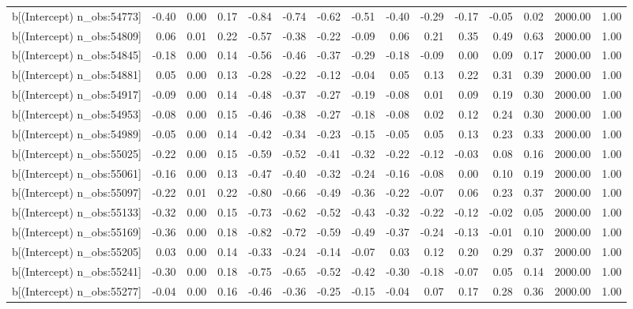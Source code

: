 \begin{table}[ht]
\begin{tabular}{rrrrrrrrrrrrrrr}
  b[(Intercept) n\_obs:54773] & -0.40 & 0.00 & 0.17 & -0.84 & -0.74 & -0.62 & -0.51 & -0.40 & -0.29 & -0.17 & -0.05 & 0.02 & 2000.00 & 1.00 \\ 
  b[(Intercept) n\_obs:54809] & 0.06 & 0.01 & 0.22 & -0.57 & -0.38 & -0.22 & -0.09 & 0.06 & 0.21 & 0.35 & 0.49 & 0.63 & 2000.00 & 1.00 \\ 
  b[(Intercept) n\_obs:54845] & -0.18 & 0.00 & 0.14 & -0.56 & -0.46 & -0.37 & -0.29 & -0.18 & -0.09 & 0.00 & 0.09 & 0.17 & 2000.00 & 1.00 \\ 
  b[(Intercept) n\_obs:54881] & 0.05 & 0.00 & 0.13 & -0.28 & -0.22 & -0.12 & -0.04 & 0.05 & 0.13 & 0.22 & 0.31 & 0.39 & 2000.00 & 1.00 \\ 
  b[(Intercept) n\_obs:54917] & -0.09 & 0.00 & 0.14 & -0.48 & -0.37 & -0.27 & -0.19 & -0.08 & 0.01 & 0.09 & 0.19 & 0.30 & 2000.00 & 1.00 \\ 
  b[(Intercept) n\_obs:54953] & -0.08 & 0.00 & 0.15 & -0.46 & -0.38 & -0.27 & -0.18 & -0.08 & 0.02 & 0.12 & 0.24 & 0.30 & 2000.00 & 1.00 \\ 
  b[(Intercept) n\_obs:54989] & -0.05 & 0.00 & 0.14 & -0.42 & -0.34 & -0.23 & -0.15 & -0.05 & 0.05 & 0.13 & 0.23 & 0.33 & 2000.00 & 1.00 \\ 
  b[(Intercept) n\_obs:55025] & -0.22 & 0.00 & 0.15 & -0.59 & -0.52 & -0.41 & -0.32 & -0.22 & -0.12 & -0.03 & 0.08 & 0.16 & 2000.00 & 1.00 \\ 
  b[(Intercept) n\_obs:55061] & -0.16 & 0.00 & 0.13 & -0.47 & -0.40 & -0.32 & -0.24 & -0.16 & -0.08 & 0.00 & 0.10 & 0.19 & 2000.00 & 1.00 \\ 
  b[(Intercept) n\_obs:55097] & -0.22 & 0.01 & 0.22 & -0.80 & -0.66 & -0.49 & -0.36 & -0.22 & -0.07 & 0.06 & 0.23 & 0.37 & 2000.00 & 1.00 \\ 
  b[(Intercept) n\_obs:55133] & -0.32 & 0.00 & 0.15 & -0.73 & -0.62 & -0.52 & -0.43 & -0.32 & -0.22 & -0.12 & -0.02 & 0.05 & 2000.00 & 1.00 \\ 
  b[(Intercept) n\_obs:55169] & -0.36 & 0.00 & 0.18 & -0.82 & -0.72 & -0.59 & -0.49 & -0.37 & -0.24 & -0.13 & -0.01 & 0.10 & 2000.00 & 1.00 \\ 
  b[(Intercept) n\_obs:55205] & 0.03 & 0.00 & 0.14 & -0.33 & -0.24 & -0.14 & -0.07 & 0.03 & 0.12 & 0.20 & 0.29 & 0.37 & 2000.00 & 1.00 \\ 
  b[(Intercept) n\_obs:55241] & -0.30 & 0.00 & 0.18 & -0.75 & -0.65 & -0.52 & -0.42 & -0.30 & -0.18 & -0.07 & 0.05 & 0.14 & 2000.00 & 1.00 \\ 
  b[(Intercept) n\_obs:55277] & -0.04 & 0.00 & 0.16 & -0.46 & -0.36 & -0.25 & -0.15 & -0.04 & 0.07 & 0.17 & 0.28 & 0.36 & 2000.00 & 1.00 \\ 

\end{tabular}
\end{table}
